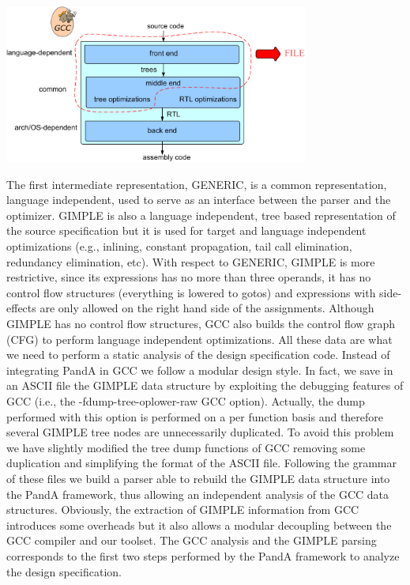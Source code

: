  
\begin{DoxyImage}
\includegraphics[width=10cm]{gcc_schema.png}
\end{DoxyImage}


The first intermediate representation, G\+E\+N\+E\+R\+IC, is a common representation, language independent, used to serve as an interface between the parser and the optimizer. G\+I\+M\+P\+LE is also a language independent, tree based representation of the source specification but it is used for target and language independent optimizations (e.\+g., inlining, constant propagation, tail call elimination, redundancy elimination, etc). With respect to G\+E\+N\+E\+R\+IC, G\+I\+M\+P\+LE is more restrictive, since its expressions has no more than three operands, it has no control flow structures (everything is lowered to gotos) and expressions with side-\/effects are only allowed on the right hand side of the assignments. Although G\+I\+M\+P\+LE has no control flow structures, G\+CC also builds the control flow graph (C\+FG) to perform language independent optimizations. All these data are what we need to perform a static analysis of the design specification code. Instead of integrating PandA in G\+CC we follow a modular design style. In fact, we save in an A\+S\+C\+II file the G\+I\+M\+P\+LE data structure by exploiting the debugging features of G\+CC (i.\+e., the -\/fdump-\/tree-\/oplower-\/raw G\+CC option). Actually, the dump performed with this option is performed on a per function basis and therefore several G\+I\+M\+P\+LE tree nodes are unnecessarily duplicated. To avoid this problem we have slightly modified the tree dump functions of G\+CC removing some duplication and simplifying the format of the A\+S\+C\+II file. Following the grammar of these files we build a parser able to rebuild the G\+I\+M\+P\+LE data structure into the PandA framework, thus allowing an independent analysis of the G\+CC data structures. Obviously, the extraction of G\+I\+M\+P\+LE information from G\+CC introduces some overheads but it also allows a modular decoupling between the G\+CC compiler and our toolset. The G\+CC analysis and the G\+I\+M\+P\+LE parsing corresponds to the first two steps performed by the PandA framework to analyze the design specification.

